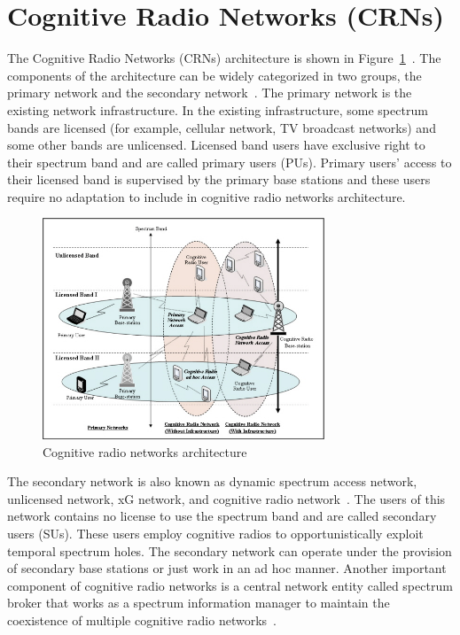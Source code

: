 \section{Cognitive Radio Networks (CRNs)}

The Cognitive Radio Networks (CRNs) architecture is shown in Figure~\ref{fig:cogArch}~\cite{bwnGatechProjectDescription}. The components of the architecture can be widely categorized in two groups, the primary network and the secondary network~\cite{akyildiz2006next}. The primary network is the existing network infrastructure. In the existing infrastructure, some spectrum bands are licensed (for example, cellular network, TV broadcast networks) and some other bands are unlicensed. Licensed band users have exclusive right to their spectrum band and are called primary users (PUs). Primary users' access to their licensed band is supervised by the primary base stations and these users require no adaptation to include in cognitive radio networks architecture. 

\begin{figure}[!htbp]
    \begin{center}
        \includegraphics[width=0.75\textwidth]{myFigures/cogarchSir.jpg}
        \caption{Cognitive radio networks architecture}
        \label{fig:cogArch}
    \end{center}
\end{figure}

The secondary network is also known as dynamic spectrum access network, unlicensed network, xG network, and cognitive radio network~\cite{akyildiz2006next}. The users of this network contains no license to use the spectrum band and are called secondary users (SUs). These users employ cognitive radios to opportunistically exploit temporal spectrum holes. The secondary network can operate under the provision of secondary base stations or just work in an ad hoc manner. Another important component of cognitive radio networks is a central network entity called spectrum broker that works as a spectrum information manager to maintain the coexistence of multiple cognitive radio networks~\cite{akyildiz2006next, buddhikot2005dimsumnet, ileri2005demand, zekavat2005user}.

